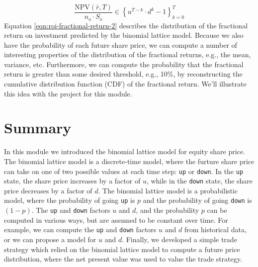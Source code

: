 \documentclass[11pt]{article}
\theoremstyle{definition}
\begin{document}
\begin{equation}\label{eqn:roi-fractional-return-2}
	\frac{\text{NPV}(\bar{r}, T)}{n_{o}\cdot{S_{o}}} \in \left\{u^{T-k}\cdot{d}^{k} - 1\right\}_{k=0}^{T}
\end{equation}
Equation \eqref{eqn:roi-fractional-return-2} describes the distribution of the fractional return on investment 
predicted by the binomial lattice model. Because we also have the probability of each future share price,
we can compute a number of interesting properties of the distribution of the fractional returns, e.g., the mean, variance, etc.
Furthermore, we can compute the probability that the fractional return is greater than some desired threshold, e.g., 10\%, by 
reconstructing the cumulative distribution function (CDF) of the fractional return.
We'll illustrate this idea with the project for this module.

\section*{Summary}
In this module we introduced the binomial lattice model for equity share price. The binomial lattice model is a discrete-time model, 
where the furture share price can take on one of two possible values at each time step: \texttt{up} or \texttt{down}.
In the \texttt{up} state, the share price increases by a factor of $u$, while in the \texttt{down} state, the share price decreases by a factor of $d$.
The binomial lattice model is a probabilistic model, where the probability of going \texttt{up} is $p$ and the probability of going \texttt{down} is $(1-p)$.
The \texttt{up} and \texttt{down} factors $u$ and $d$, and the probability $p$ can be computed in various ways, but are assumed to be constant over time.
For example, we can compute the \texttt{up} and \texttt{down} factors $u$ and $d$ from historical data, or we can propose a model for $u$ and $d$.
Finally, we developed a simple trade strategy which relied on the binomial lattice model to compute a future price distribution, 
where the net present value was used to value the trade strategy.



\clearpage
\printindex
\end{document}
